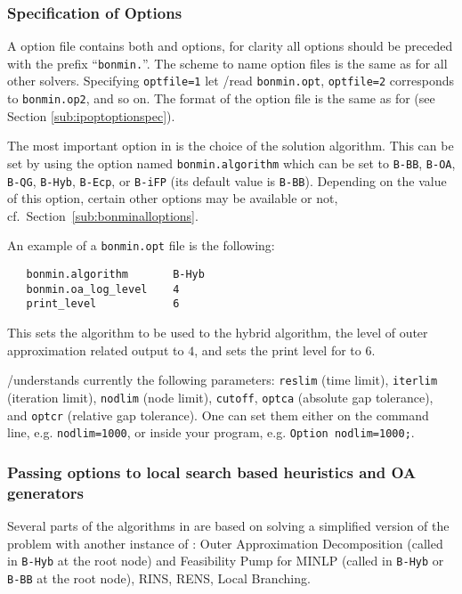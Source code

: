 \subsubsection{Specification of Options}

A \BONMIN option file contains both \IPOPT and \BONMIN options, for clarity all \BONMIN options should be preceded with the prefix ``\texttt{bonmin.}''. %
The scheme to name option files is the same as for all other \GAMS solvers.
Specifying \texttt{optfile=1} let \GAMS/\BONMIN read \texttt{bonmin.opt}, \texttt{optfile=2} corresponds to \texttt{bonmin.op2}, and so on.
The format of the option file is the same as for \IPOPT (see Section \ref{sub:ipoptoptionspec}).

The most important option in \BONMIN is the choice of the solution algorithm.
This can be set by using the option named \texttt{bonmin.algorithm} which can be set to \texttt{B-BB}, \texttt{B-OA}, \texttt{B-QG}, \texttt{B-Hyb}, \texttt{B-Ecp}, or \texttt{B-iFP} (its default value is \texttt{B-BB}).
Depending on the value of this option, certain other options may be available or not, cf.\ Section~\ref{sub:bonminalloptions}.

An example of a \texttt{bonmin.opt} file is the following:
\begin{verbatim}
   bonmin.algorithm       B-Hyb
   bonmin.oa_log_level    4
   print_level            6
\end{verbatim}
This sets the algorithm to be used to the hybrid algorithm, the level of outer approximation related output to $4$,
and sets the print level for \IPOPT to $6$.

\GAMS/\BONMIN understands currently the following \GAMS parameters: \texttt{reslim} (time limit), \texttt{iterlim} (iteration limit), \texttt{nodlim} (node limit), \texttt{cutoff}, \texttt{optca} (absolute gap tolerance), and \texttt{optcr} (relative gap tolerance).
One can set them either on the command line, e.g. \verb+nodlim=1000+, or inside your \GAMS program, e.g. \verb+Option nodlim=1000;+.

\subsubsection{Passing options to local search based heuristics and OA generators}
Several parts of the algorithms in \BONMIN are based on solving a simplified version of the problem with another instance of \BONMIN:
Outer Approximation Decomposition (called in {\tt B-Hyb} at the root node)
and Feasibility Pump for MINLP (called in {\tt B-Hyb} or {\tt B-BB} at the root node), RINS, RENS, Local Branching.

